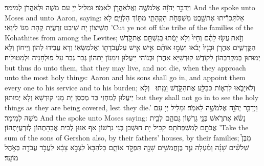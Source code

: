 {וַיְדַבֵּ֣ר יְהֹוָ֔ה אֶל\maqqaf מֹשֶׁ֥ה וְאֶֽל\maqqaf אַהֲרֹ֖ן לֵאמֹֽר׃}
{וּמַלֵּיל יְיָ עִם מֹשֶׁה וּלְאַהֲרֹן לְמֵימַר׃}
{And the \lord\space spoke unto Moses and unto Aaron, saying:}{}
{אַל\maqqaf תַּכְרִ֕יתוּ אֶת\maqqaf שֵׁ֖בֶט מִשְׁפְּחֹ֣ת הַקְּהָתִ֑י מִתּ֖וֹךְ הַלְוִיִּֽם׃}
{לָא תְשֵׁיצוֹן יָת שֵׁיבַט זַרְעֲיָת קְהָת מִגּוֹ לֵיוָאֵי׃}
{’Cut ye not off the tribe of the families of the Kohathites from among the Levites;}{}
{וְזֹ֣את \legarmeh  עֲשׂ֣וּ לָהֶ֗ם וְחָיוּ֙ וְלֹ֣א יָמֻ֔תוּ בְּגִשְׁתָּ֖ם אֶת\maqqaf קֹ֣דֶשׁ הַקֳּדָשִׁ֑ים אַהֲרֹ֤ן וּבָנָיו֙ יָבֹ֔אוּ וְשָׂמ֣וּ אוֹתָ֗ם אִ֥ישׁ אִ֛ישׁ עַל\maqqaf עֲבֹדָת֖וֹ וְאֶל\maqqaf מַשָּׂאֽוֹ׃}
{וְדָא עֲבִידוּ לְהוֹן וְיֵיחוֹן וְלָא יְמוּתוּן בְּמִקְרַבְהוֹן לְקוֹדֶשׁ קוּדְשַׁיָּא אַהֲרֹן וּבְנוֹהִי יֵיעֲלוּן וִימַנּוֹן יָתְהוֹן גְּבַר גְּבַר עַל פּוּלְחָנֵיהּ וּלְמַטוּלֵיהּ׃}
{but thus do unto them, that they may live, and not die, when they approach unto the most holy things: Aaron and his sons shall go in, and appoint them every one to his service and to his burden;}{}
{וְלֹא\maqqaf יָבֹ֧אוּ לִרְא֛וֹת כְּבַלַּ֥ע אֶת\maqqaf הַקֹּ֖דֶשׁ וָמֵֽתוּ׃ \petucha }
{וְלָא יֵיעֲלוּן לְמִחְזֵי כַּד מְכַסַּן יָת מָנֵי קוּדְשָׁא וְלָא יְמוּתוּן׃}
{but they shall not go in to see the holy things as they are being covered, lest they die.’}{}
{וַיְדַבֵּ֥ר יְהֹוָ֖ה אֶל\maqqaf מֹשֶׁ֥ה לֵּאמֹֽר׃}
{וּמַלֵּיל יְיָ עִם מֹשֶׁה לְמֵימַר׃}
{And the \lord\space spoke unto Moses saying:}{}
{נָשֹׂ֗א אֶת\maqqaf רֹ֛אשׁ בְּנֵ֥י גֵרְשׁ֖וֹן גַּם\maqqaf הֵ֑ם לְבֵ֥ית אֲבֹתָ֖ם לְמִשְׁפְּחֹתָֽם׃}
{קַבֵּיל יָת חוּשְׁבַּן בְּנֵי גֵרְשׁוֹן אַף אִנּוּן לְבֵית אֲבָהָתְהוֹן לְזַרְעֲיָתְהוֹן׃}
{’Take the sum of the sons of Gershon also, by their fathers’ houses, by their families;}{}
{מִבֶּן֩ שְׁלֹשִׁ֨ים שָׁנָ֜ה וָמַ֗עְלָה עַ֛ד בֶּן\maqqaf חֲמִשִּׁ֥ים שָׁנָ֖ה תִּפְקֹ֣ד אוֹתָ֑ם כׇּל\maqqaf הַבָּא֙ לִצְבֹ֣א צָבָ֔א לַעֲבֹ֥ד עֲבֹדָ֖ה בְּאֹ֥הֶל מוֹעֵֽד׃}
